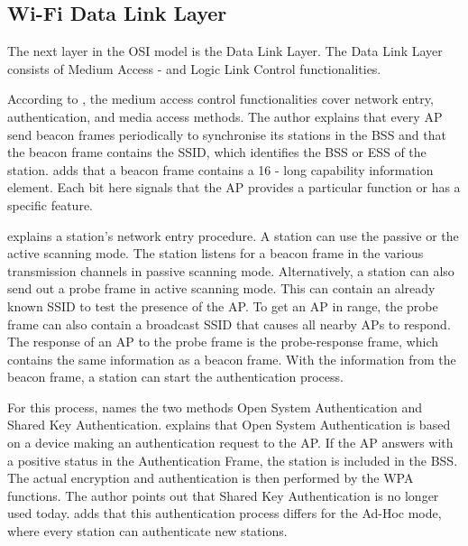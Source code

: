 \subsection*{Wi-Fi Data Link Layer}

The next layer in the OSI model is the Data Link Layer.
The Data Link Layer consists of Medium Access - and Logic Link Control functionalities.


According to \textcite{kauffels_wireless_2002}, the medium access control functionalities cover network entry, authentication, and media access methods.
The author explains that every \ac{AP} send beacon frames periodically to synchronise its stations in the \ac{BSS} and that the beacon frame contains the \ac{SSID}, which identifies the \ac{BSS} or \ac{ESS} of the station. \textcite{sauter_wireless_2022} adds that a beacon frame contains a \SI{16}{\bit} - long capability information element. Each bit here signals that the \ac{AP} provides a particular function or has a specific feature.

\textcite{kauffels_wireless_2002} explains a station's network entry procedure.
A station can use the passive or the active scanning mode.
The station listens for a beacon frame in the various transmission channels in passive scanning mode.
Alternatively, a station can also send out a probe frame in active scanning mode.
This can contain an already known \ac{SSID} to test the presence of the \ac{AP}.
To get an \ac{AP} in range, the probe frame can also contain a broadcast SSID that causes all nearby \ac{AP}s to respond.
The response of an \ac{AP} to the probe frame is the probe-response frame, which contains the same information as a beacon frame.
With the information from the beacon frame, a station can start the authentication process.

For this process, \textcite{kauffels_wireless_2002} names the two methods Open System Authentication and Shared Key Authentication.
\textcite{sauter_wireless_2022} explains that Open System Authentication is based on a device making an authentication
request to the \ac{AP}. If the \ac{AP} answers with a positive status in the Authentication Frame,
the station is included in the \ac{BSS}.
The actual encryption and authentication is then performed by the \ac{WPA} functions.
The author points out that Shared Key Authentication is no longer used today.
\textcite{sommer_vehicular_2014} adds that this authentication process differs for the Ad-Hoc mode, where every station can
authenticate new stations.

